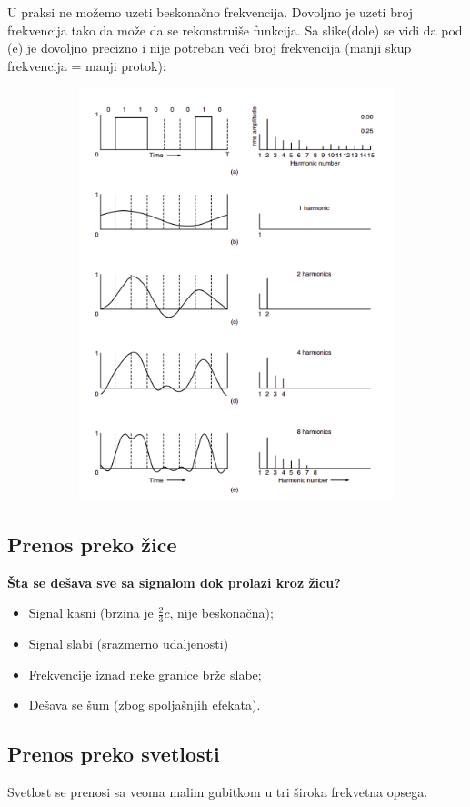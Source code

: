 \documentclass[a4paper]{article}
\begin{document}
        U praksi ne možemo uzeti beskonačno frekvencija. Dovoljno je uzeti broj frekvencija
        tako da može da se rekonstruiše funkcija. Sa slike(dole) se vidi da pod (e) je dovoljno
        precizno i nije potreban veći broj frekvencija (manji skup frekvencija = manji protok):
        \begin{figure}[H]
            \begin{center}
                \includegraphics[width=120mm,height=120mm]{Slike/furije3.png}
            \end{center}
        \end{figure}
    \subsection{Prenos preko žice}
        \noindent \textbf{Šta se dešava sve sa signalom dok prolazi kroz žicu?}
        \begin{itemize}
            \item Signal kasni (brzina je $\frac{2}{3}c$, nije beskonačna);
            \item Signal slabi (srazmerno udaljenosti)
            \item Frekvencije iznad neke granice brže slabe;
            \item Dešava se šum (zbog spoljašnjih efekata).
        \end{itemize}
    \subsection{Prenos preko svetlosti}
        Svetlost se prenosi sa veoma malim gubitkom u tri široka frekvetna opsega.\\
        
\end{document}
